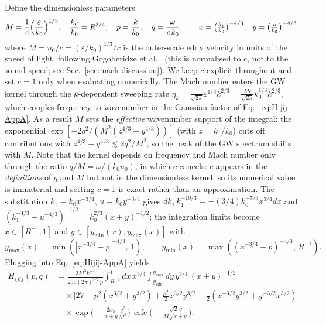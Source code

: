 \documentclass[10pt,prd,aps,nobibnotes,superscriptaddress,preprintnumbers,notitlepage]{revtex4-1}
\begin{document}
Define the dimensionless parameters
\begin{equation}
  M=\frac{1}{c}\Bigl(\frac{\varepsilon}{k_0}\Bigr)^{1/3},\quad \frac{k_d}{k_0}=R^{3/4},\quad p=\frac{k}{k_0},\quad q=\frac{\omega}{c\,k_0},
  \qquad
  x=\bigl(\tfrac{k_1}{k_0}\bigr)^{-4/3},\ \ y=\bigl(\tfrac{u}{k_0}\bigr)^{-4/3},
  \label{eq:appA-dimless}
\end{equation}
where $M=u_0/c=(\varepsilon/k_0)^{1/3}/c$ is the outer-scale eddy velocity in units of the speed of light, following Gogoberidze et al.~\cite{Gogoberidze:2007an} (this is normalised to $c$, not to the sound speed; see Sec.~\ref{sec:mach-discussion}). We keep $c$ explicit throughout and set $c=1$ only when evaluating numerically. The Mach number enters the GW kernel through the $k$-dependent sweeping rate $\eta_k=\tfrac{1}{\sqrt{2\pi}}\varepsilon^{1/3}k^{2/3}=\tfrac{Mc}{\sqrt{2\pi}}k_0^{1/3}k^{2/3}$, which couples frequency to wavenumber in the Gaussian factor of Eq.~\eqref{eq:Hijij-AppA}. As a result $M$ sets the \emph{effective} wavenumber support of the integral: the exponential $\exp[-2q^2/(M^2(z^{4/3}+y^{4/3}))]$ (with $z=k_1/k_0$) cuts off contributions with $z^{4/3}+y^{4/3}\lesssim 2q^2/M^2$, so the peak of the GW spectrum shifts with $M$. Note that the kernel depends on frequency and Mach number only through the ratio $q/M=\omega/(k_0 u_0)$, in which $c$ cancels: $c$ appears in the \emph{definitions} of $q$ and $M$ but not in the dimensionless kernel, so its numerical value is immaterial and setting $c=1$ is exact rather than an approximation.
The substitution $k_1=k_0 x^{-3/4}$, $u=k_0 y^{-3/4}$ gives $dk_1\,k_1^{-10/3}=-(3/4)k_0^{-7/3}x^{3/4}dx$ and $(k_1^{-4/3}+u^{-4/3})^{-1/2}=k_0^{2/3}(x+y)^{-1/2}$; the integration limits become $x\in[R^{-1},1]$ and $y\in[y_{\min}(x),y_{\max}(x)]$ with
\begin{equation}
  y_{\max}(x)=\min(|x^{-3/4}-p|^{-4/3},\,1),
  \qquad
  y_{\min}(x)=\max((x^{-3/4}+p)^{-4/3},\,R^{-1}).
  \label{eq:appA-y-bounds}
\end{equation}
Plugging into Eq.~\eqref{eq:Hijij-AppA} yields
\begin{align}
  H_{ijij}(p,q) &= \frac{3 M^3 k_0^{-4}}{256(2\pi)^{3/2}\,p}
  \int_{R^{-1}}^{1}\!dx\,x^{3/4}\!\int_{y_{\min}}^{y_{\max}}\!dy\,y^{3/4}\,(x+y)^{-1/2}\nonumber\\
  &\quad\times\bigl[27 - p^2(x^{3/2}+y^{3/2}) + \tfrac{p^4}{2}x^{3/2}y^{3/2} + \tfrac{1}{2}(x^{-3/2}y^{3/2}+y^{-3/2}x^{3/2})\bigr]\nonumber\\
  &\quad\times\exp\!\bigl(-\tfrac{2xy}{x+y}\tfrac{q^2}{M^2}\bigr)\,
  \operatorname{erfc}\!\bigl(-\tfrac{\sqrt{2}\,q}{M\sqrt{x+y}}\bigr).
  \label{eq:Hijij-AppA-dimless}
\end{align}
\end{document}
